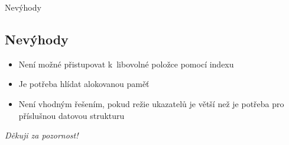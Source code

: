 \documentclass[15pt]{beamer}
\begin{document}
\begin{frame}{Nevýhody}
	\subsection{Nevýhody}

	\begin{itemize}
		\item Není možné přistupovat k~libovolné položce pomocí indexu
		\item Je potřeba hlídat alokovanou paměť
		\item Není vhodným řešením, pokud režie ukazatelů je větší než je potřeba pro příslušnou datovou strukturu
	\end{itemize}
\end{frame}

\begin{frame}{}
	\centering \Huge
	\emph{Děkuji za pozornost!}
\end{frame}
\end{document}
